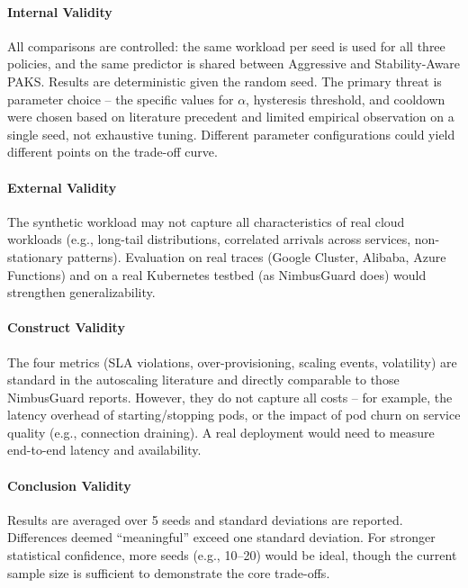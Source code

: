\paragraph{Internal Validity} All comparisons are controlled: the same workload per seed is used for all three policies, and the same predictor is shared between Aggressive and Stability-Aware PAKS. Results are deterministic given the random seed. The primary threat is parameter choice -- the specific values for $\alpha$, hysteresis threshold, and cooldown were chosen based on literature precedent and limited empirical observation on a single seed, not exhaustive tuning. Different parameter configurations could yield different points on the trade-off curve.

\paragraph{External Validity} The synthetic workload may not capture all characteristics of real cloud workloads (e.g., long-tail distributions, correlated arrivals across services, non-stationary patterns). Evaluation on real traces (Google Cluster, Alibaba, Azure Functions) and on a real Kubernetes testbed (as NimbusGuard does) would strengthen generalizability.

\paragraph{Construct Validity} The four metrics (SLA violations, over-provisioning, scaling events, volatility) are standard in the autoscaling literature and directly comparable to those NimbusGuard reports. However, they do not capture all costs -- for example, the latency overhead of starting/stopping pods, or the impact of pod churn on service quality (e.g., connection draining). A real deployment would need to measure end-to-end latency and availability.

\paragraph{Conclusion Validity} Results are averaged over 5 seeds and standard deviations are reported. Differences deemed ``meaningful'' exceed one standard deviation. For stronger statistical confidence, more seeds (e.g., 10--20) would be ideal, though the current sample size is sufficient to demonstrate the core trade-offs.
